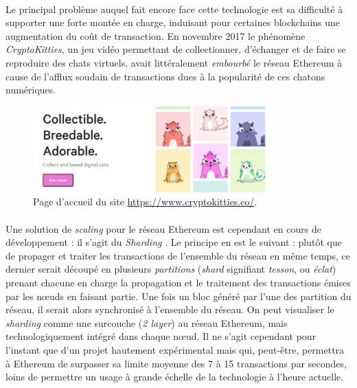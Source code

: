 \paragraph{} Le principal problème auquel fait encore face cette technologie est sa difficulté à supporter une forte montée 
en charge, induisant pour certaines blockchains une augmentation du coût de transaction. En novembre 2017 le phénomène
\emph{CryptoKitties}, un jeu vidéo permettant de collectionner, d'échanger et de faire se reproduire des chats virtuels,
avait littéralement \emph{embourbé} le réseau Ethereum à cause de l'afflux soudain de transactions dues à la popularité
de ces chatons numériques.

\begin{figure}[ht]
    \centering
    \includegraphics[width=350px]{chapters/02/images/cryptokitties.png}
    \caption{\label{cryptokitties}Page d'accueil du site \url{https://www.cryptokitties.co/}.}
\end{figure}

\paragraph{} Une solution de \emph{scaling} pour le réseau Ethereum est cependant en cours de développement : il s'agit du 
\emph{Sharding} \cite{Blockchain0}. Le principe en est le suivant : plutôt que de propager et traiter les transactions de
l'ensemble du réseau en même temps, ce dernier serait découpé en plusieurs \emph{partitions} (\emph{shard} signifiant 
\emph{tesson}, ou \emph{éclat}) prenant chacune en charge la propagation et le traitement des transactions émises par les
n\oe{}uds en faisant partie. Une fois un bloc généré par l'une des partition du réseau, il serait alors synchronisé à l'ensemble
du réseau. On peut visualiser le \emph{sharding} comme une surcouche (\emph{2 layer}) au réseau Ethereum, mais technologiquement
intégré dans chaque n\oe{}ud. Il ne s'agit cependant pour l'instant que d'un projet hautement expérimental mais qui, peut-être, 
permettra à Ethereum de surpasser sa limite moyenne des 7 à 15 transactions par secondes, loins de permettre un usage à grande
échelle de la technologie à l'heure actuelle.

